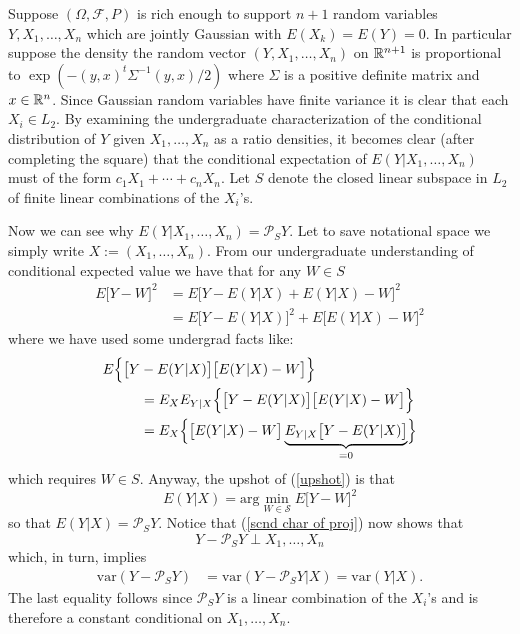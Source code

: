 Suppose $(\Omega, \mathcal F, P)$ is rich enough to support $n+1$ random variables $Y, X_1, \ldots, X_n$ which are jointly Gaussian with $E(X_k) = E(Y) = 0$. In particular suppose the density the random vector $(Y, X_1, \ldots, X_n)$ on $\Bbb R^{n+1}$ is proportional to $\exp(- (y,x)^t \Sigma^{-1} (y, x)/2)$ where $\Sigma$ is a positive definite matrix and $x\in \Bbb R^n$. Since Gaussian random variables have finite variance it is clear that each $X_i\in L_2$.  By examining the undergraduate characterization of the conditional distribution of $Y$ given $X_1, \ldots, X_n$ as a ratio densities, it becomes clear (after completing the square) that the conditional expectation of $E(Y | X_1, \ldots, X_n)$ must of the form $c_1 X_1  +\cdots + c_nX_n$. Let $S$ denote the closed linear subspace in $L_2$ of finite linear combinations of the $X_i$'s.

Now we can see why $E(Y| X_1, \ldots, X_n) = \mathcal P_S Y$. Let to save notational space we simply write $X:= (X_1, \ldots, X_n)$.
From our undergraduate understanding of conditional expected value we have that for any $W\in S$
\begin{align}
\nonumber
E\bigl[Y - W\bigr]^2  &= E\bigl[ Y - E(Y|X) + E(Y|X)- W\bigr]^2 \\
&= E\bigl[ Y - E(Y|X)\bigr]^2 + E\bigl[ E(Y|X)- W\bigr]^2
\label{upshot}
\end{align}
where we have used some undergrad facts like:
\begin{align*}
E\Bigl\{ \bigl[ Y &- E(Y|X)\bigr] \bigl[ E(Y|X)- W\bigr]\Bigr\}  \\
&=  E_{X}E_{Y|X}\Bigl\{\bigl[ Y - E(Y|X)\bigr] \bigl[ E(Y|X)- W\bigr]\Bigr\}  \\
&=  E_{X} \Bigl\{ \bigl[ E(Y|X)- W\bigr]  \underbrace{E_{Y|X}\bigl[ Y - E(Y|X)\bigr]}_{=0}\Bigr\}
\end{align*}
which requires $W\in S$. Anyway, the upshot of (\ref{upshot})  is that
\[ E(Y|X) = \text{arg}\min_{W\in \mathcal S} E\bigl[Y - W\bigr]^2   \]
so that $E(Y|X) = \mathcal P_S Y$. Notice that (\ref{scnd char of proj}) now shows that
\[ Y - \mathcal P_S Y \perp X_1, \ldots, X_n  \]
which, in turn, implies
\begin{align}
\text{var}( Y - \mathcal P_S Y ) & = \text{var}( Y - \mathcal P_S Y|  X  ) = \text{var}( Y | X  ) \label{Gauss variance}.
\end{align}
The last equality follows since $\mathcal P_S Y$ is a linear combination of the $X_i$'s  and is therefore a constant conditional on $X_1, \ldots, X_n$.  


